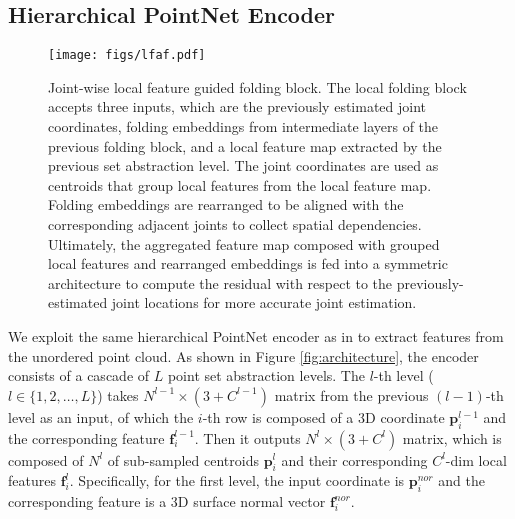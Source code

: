 \documentclass[10pt,twocolumn,letterpaper]{article}
\begin{document}
\subsection{Hierarchical PointNet Encoder}


\begin{figure*}
\centering
\texttt{[image: figs/lfaf.pdf]}
\caption{Joint-wise local feature guided folding block. The local folding block accepts three inputs, which are the previously estimated joint coordinates, folding embeddings from intermediate layers of the previous folding block, and a local feature map extracted by the previous set abstraction level. The joint coordinates are used as centroids that group local features from the local feature map. Folding embeddings are rearranged to be aligned with the corresponding adjacent joints to collect spatial dependencies. Ultimately, the aggregated feature map composed with grouped local features and rearranged embeddings is fed into a symmetric architecture to compute the residual with respect to the previously-estimated joint locations for more accurate joint estimation.}
\label{fig:lsfaf}
\end{figure*}

We exploit the same hierarchical PointNet encoder as in \cite{ge2018hand, ge2018point} to extract features from the unordered point cloud. 
As shown in Figure \ref{fig:architecture}, the encoder consists of a cascade of $L$ point set abstraction levels. 
The $l$-th level ($l \in \{1, 2,…, L\}$) takes $N^{l-1} \times (3 + C^{l-1})$ matrix from the previous $(l-1)$-th level as an input, of which the $i$-th row is composed of a 3D coordinate $\mathbf{p}_i^{l-1}$ and the corresponding feature $\textbf{f}_i^{l-1}$. 
Then it outputs $N^l \times (3 + C^l)$ matrix, 
which is composed of $N^l$ of sub-sampled centroids $\textbf{p}_i^l$ and their corresponding $C^l$-dim local features $ \mathbf{f}_i^l$.
Specifically, for the first level, the input coordinate is $\textbf{p}_i^{nor}$ and the corresponding feature is a 3D surface normal vector $\textbf{f}_i^{nor}$. 
\end{document}
